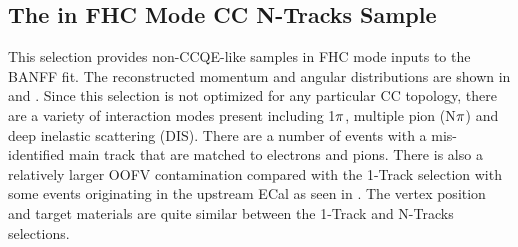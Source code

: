 \subsection{The \numutitle{} in FHC Mode CC N-Tracks Sample\label{subsec:numuFHCCCNTrk}}

This selection provides non-CCQE-like samples in FHC mode inputs to
the BANFF fit. The reconstructed momentum and angular distributions
are shown in  and .
Since this selection is not optimized for any particular CC topology,
there are a variety of interaction modes present including 1$\pi$,
multiple pion (N$\pi$) and deep inelastic scattering (DIS). There
are a number of events with a mis-identified main track that are matched
to electrons and pions. There is also a relatively larger OOFV contamination
compared with the 1-Track selection with some events originating in
the upstream ECal as seen in .
The vertex position and target materials are quite similar between
the 1-Track and N-Tracks selections.

